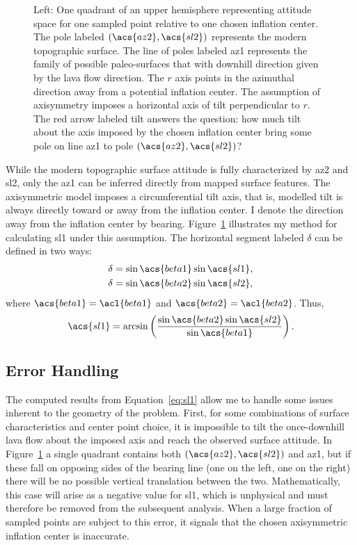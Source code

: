 \begin{figure}
\begin{center}
    \hspace{1cm}%
    \caption{Left: One quadrant of an upper hemisphere representing attitude space for one sampled point relative to one chosen inflation center. The pole labeled $\left(\acs{az2},\acs{sl2}\right)$ represents the modern topographic surface. The line of poles labeled \acs{az1} represents the family of possible paleo-surfaces that with downhill direction given by the lava flow direction. The $r$ axis points in the azimuthal direction away from a potential inflation center. The assumption of axisymmetry imposes a horizontal axis of tilt perpendicular to $r$. The red arrow labeled \acs{tilt} answers the question: how much tilt about the axis imposed by the chosen inflation center bring some pole on line \acs{az1} to pole $\left(\acs{az2},\acs{sl2}\right)$?}%
    \label{fig:tilt-from-map}%
\end{center}
\end{figure}
While the modern topographic surface attitude is fully characterized by \acs{az2} and \acs{sl2}, only the \acf{az1} can be inferred directly from mapped surface features. The axisymmetric model imposes a circumferential tilt axis, that is, modelled tilt is always directly toward or away from the inflation center. I denote the direction away from the inflation center by \acs{bearing}. Figure~\ref{fig:tilt-from-map} illustrates my method for calculating \acf{sl1} under this assumption. The horizontal segment labeled $\delta$ can be defined in two ways:
\begin{gather*}
    \delta = \sin\acs{beta1}\sin\acs{sl1},\\
    \delta = \sin\acs{beta2}\sin\acs{sl2},
\end{gather*}
where $\acs{beta1} = \acl{beta1}$ and $\acs{beta2} = \acl{beta2}$. Thus,
\begin{equation}
    \acs{sl1} = \arcsin\left(\frac{\sin\acs{beta2}\sin\acs{sl2}}{\sin\acs{beta1}}\right).\label{eq:sl1}
\end{equation}
\subsection{Error Handling}
The computed results from Equation~\eqref{eq:sl1} allow me to handle some issues inherent to the geometry of the problem. First, for some combinations of surface characteristics and center point choice, it is impossible to tilt the once-downhill lava flow about the imposed axis and reach the observed surface attitude. In Figure~\ref{fig:tilt-from-map} a single quadrant contains both $\left(\acs{az2},\acs{sl2}\right)$ and \acs{az1}, but if these fall on opposing sides of the \acs{bearing} line (one on the left, one on the right) there will be no possible vertical translation between the two. Mathematically, this case will arise as a negative value for \acs{sl1}, which is unphysical and must therefore be removed from the subsequent analysis. When a large fraction of sampled points are subject to this error, it signals that the chosen axisymmetric inflation center is inaccurate.

